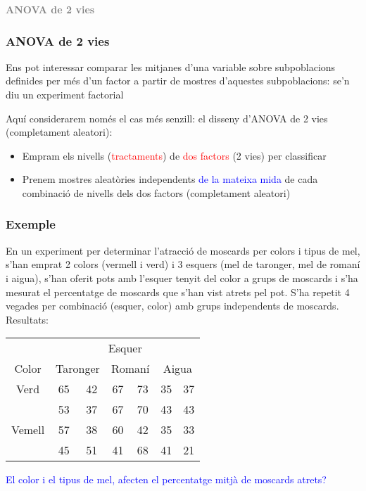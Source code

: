 \documentclass[12pt,t]{beamer}
\newcommand{\red}[1]{\textcolor{red}{#1}}
\newcommand{\blue}[1]{\textcolor{blue}{#1}}
\newcommand{\gray}[1]{\textcolor{gray}{#1}}
\renewcommand{\emph}[1]{{\color{red}#1}}
\theoremstyle{plain}
\theoremstyle{definition}
\begin{document}
\begin{frame}
\vfill
\begin{center}
\gray{\LARGE\bf ANOVA de 2 vies}
\end{center}
\end{frame}


\begin{frame}
\frametitle{ANOVA de 2 vies}

Ens pot interessar comparar les mitjanes d'una variable sobre subpoblacions definides per més d'un factor a partir de mostres d'aquestes subpoblacions:  se'n diu un \emph{experiment factorial}\
\bigskip

Aquí considerarem només el  cas més senzill: el disseny d'\emph{ANOVA de 2 vies} (\emph{completament aleatori}):\medskip

\begin{itemize}
\item Empram els nivells (\red{tractaments}) de \red{dos factors} (\emph{2 vies})
 per classificar \medskip

\item Prenem mostres aleatòries independents \blue{de la mateixa mida} de cada combinació de nivells dels dos factors (\emph{completament aleatori})
\end{itemize}
\end{frame}



\begin{frame}
\frametitle{Exemple}

En un experiment per determinar l'atracció de moscards per colors i tipus de mel, s'han emprat 2 colors (vermell i verd) i 3 esquers (mel de taronger, mel de romaní i aigua), s'han oferit pots amb l'esquer tenyit del color a  grups  de moscards i s'ha mesurat el percentatge de moscards que s'han vist atrets pel pot. S'ha repetit 4 vegades per combinació (esquer, color) amb grups independents de moscards. Resultats:\vspace*{-2ex}

\begin{center}
\begin{tabular}{c|cc|cc|cc|}
\multicolumn{1}{c}{ }&\multicolumn{6}{c}{Esquer}\\\cline{2-7}
Color & \multicolumn{2}{|c|}{Taronger}& \multicolumn{2}{|c|}{Romaní} & \multicolumn{2}{|c|}{Aigua}\\\hline
Verd &65 &42 & 67 & 73 & 35 & 37  \\
& 53 &37 & 67  &70& 43 & 43\\\hline
 Vemell & 57 & 38  &60& 42& 35 & 33 \\
 &45 & 51 & 41& 68& 41 & 21 \\\hline
\end{tabular}
\end{center}

\blue{El color i el tipus de mel, afecten el percentatge mitjà de moscards atrets?}

\end{frame}
\end{document}
